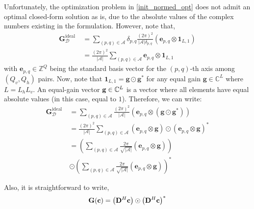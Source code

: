 Unfortunately, the optimization problem in \eqref{init_normed_opt} does not admit an optimal closed-form solution as is, due to the absolute values of the complex numbers existing in the formulation. However, note that, 
\begin{align}
    \mathbf{G}^{\text {ideal }}_{\mathcal{D}}&=\sum_{(p,q) \in \mathcal{A}}\delta_{p,q}\frac{(2\pi)^2}{|\mathcal{A}|\delta_{p,q}}\left(\mathbf{e}_{p,q} \otimes \mathbf{1}_{L, 1}\right) \nonumber\\&= \frac{(2\pi)^2}{|\mathcal{A}|}\sum_{(p,q) \in \mathcal{A}}{\mathbf{e}_{p,q} \otimes \mathbf{1}_{L, 1}}
    \label{ideal}
\end{align}
with $\mathbf{e}_{p,q} \in \mathbb{Z}^{Q}$ being the standard basis vector for the $(p,q)$-th axis among $(Q_v, Q_h)$ pairs. Now, note that $\mathbf{1}_{L, 1}=\mathbf{g} \odot \mathbf{g}^{*}$ for any equal gain $\mathbf{g} \in \mathbb{C}^L$ where $L = L_hL_v$. An equal-gain  vector ${\bf{g}} \in \mathbb{C}^L$ is a vector where all elements have equal absolute values (in this case, equal to $1$). Therefore, we can write: 
\begin{align}
\mathbf{G}^{\text {ideal }}_{\mathcal{D}} &= \sum_{(p,q) \in \mathcal{A}}\frac{(2\pi)^2}{|\mathcal{A}|}\left(\mathbf{e}_{p,q} \otimes\left(\mathbf{g} \odot \mathbf{g}^{*}\right)\right) \nonumber\\
&=\frac{(2\pi)^2}{|\mathcal{A}|}\sum_{(p,q) \in \mathcal{A}}\left(\mathbf{e}_{p,q} \otimes \mathbf{g}\right) \odot\left(\mathbf{e}_{p,q} \otimes \mathbf{g}\right)^{*} \nonumber\\
&=\left(\sum_{(p,q) \in \mathcal{A}}\frac{2\pi}{\sqrt{|\mathcal{A}|}}\left(\mathbf{e}_{p,q} \otimes \mathbf{g}\right)\right)  \nonumber\\&\odot \left(\sum_{(p,q) \in \mathcal{A}}\frac{2\pi}{\sqrt{|\mathcal{A}|}}\left(\mathbf{e}_{p,q} \otimes \mathbf{g}\right)\right)^* \label{final_gik}
\end{align}

Also, it is straightforward to write, 
\begin{align}
    \mathbf{G}({\bf{c}})=\left({\bf{D}}^H {\bf{c}}\right) \odot\left({\bf{D}}^H {\bf{c}}\right)^{*}\label{dc}
\end{align}

